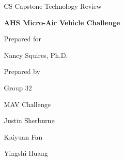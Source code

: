 \documentclass[onecolumn, draftclsnofoot,10pt, compsoc]{IEEEtran}
\def \CapstoneTeamName{		MAV Challenge}
\def \CapstoneTeamNumber{		32}
\def \GroupMemberOne{			Justin Sherburne}
\def \GroupMemberTwo{			Kaiyuan Fan}
\def \GroupMemberThree{			Yingshi Huang}
\def \CapstoneProjectName{		AHS Micro-Air Vehicle Challenge}
\def \CapstoneSponsorPerson{		Nancy Squires, Ph.D.}
\def \DocType{
				Technology Review
				}
\newcommand{\NameSigPair}[1]{\par
\makebox[2.75in][r]{#1} \hfil 	\makebox[3.25in]{\makebox[2.25in]{\hrulefill} \hfill		\makebox[.75in]{\hrulefill}}
\par\vspace{-12pt} \textit{\tiny\noindent
\makebox[2.75in]{} \hfil		\makebox[3.25in]{\makebox[2.25in][r]{Signature} \hfill	\makebox[.75in][r]{Date}}}}
\renewcommand{\NameSigPair}[1]{#1}
\begin{document}
\begin{titlepage}
    \begin{singlespace}
    	  \hfill
        \par\vspace{.2in}
        \centering
        \scshape{
            \huge CS Capstone \DocType \par
            \textbf{\Huge\CapstoneProjectName}\par
			\vspace{1.5in}
            {\large Prepared for}\par
            {\Large\NameSigPair{\CapstoneSponsorPerson}\par}
			\vspace{3pt}
            {\large Prepared by }\par
            Group\CapstoneTeamNumber\par
            \CapstoneTeamName\par
            \vspace{8pt}
            {\Large
                \NameSigPair{\GroupMemberOne}\par
                \NameSigPair{\GroupMemberTwo}\par
                \NameSigPair{\GroupMemberThree}\par
            }
            \vspace{.5in}
        }
        \begin{abstract}
				Technology Review is to organize detail of criterion,
				determine the existing technologies and select the most
				appropriate method. The problems and features can allocate in four parts,
				wireless communication, communication, controller and
				calculation. At the beginning, design the wireless communication.
				Then, decide the communication between micro-helicopter and the control board;
				on the base of competitions rules, UDP, TCP, and Web-Internet.
				These communications consider as possible solutions for connection.
				After building the communication of data,
				the controller of hardware depends on on-market products
				which can match micro-helicopter computer and
				control board. Last but not lease, calculation is an individual feature.
				The computer will self-calculates for moving.
				Camera, software libraries, distance sensor
				and accelerate positioning will provide information
				for driving the micro-helicopter.
				\end{abstract}
    \end{singlespace}
\end{titlepage}
\newpage
{}
\tableofcontents
\clearpage
\end{document}
